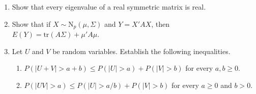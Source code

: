 \documentclass[11pt]{article}
\begin{document}
\begin{enumerate}
\item Show that every eigenvalue of a real symmetric matrix is real.

\item Show that if $X \sim \text{N}_{p}(\mu, \Sigma)$ and $Y = X'AX$, then $E(Y) = \text{tr}(A\Sigma) + \mu'A\mu$.

\item Let $U$ and $V$ be random variables.  Establish the following inequalities.
\begin{enumerate}
\item $P(|U+V| > a + b) \le P(|U| > a) + P(|V| > b)$ for every $a,b \ge 0$.
\item $P(|UV| > a) \le P(|U| > a/b) + P(|V| > b)$ for every $a \ge 0$ and $b > 0$.
\end{enumerate}

\end{enumerate}
\end{document}
